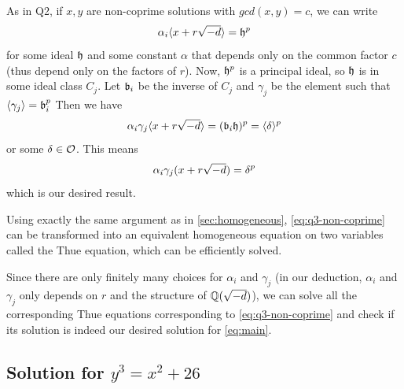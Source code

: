 As in Q2, if $x, y$ are non-coprime solutions with $gcd(x, y) = c$, we can write 
$$
	\alpha_i \langle x + r \sqrt{-d} \rangle = \mathfrak{h} ^p
$$
for some ideal $\mathfrak{h}$ and some constant $\alpha$ that depends only on the common factor $c$ (thus depend only on the factors of $r$).
Now, $\mathfrak{h}^p$ is a principal ideal, so $\mathfrak{h}$ is in some ideal class $C_j$.
Let $\mathfrak{b}_i$ be the inverse of $C_j$ and $\gamma_j$ be the element such that $\langle \gamma_j \rangle = \mathfrak{b}_i^p$
Then we have
$$
\alpha_i \gamma_j \langle x + r\sqrt{-d} \rangle= (\mathfrak{b}_i \mathfrak{h})^p = \langle \delta \rangle^p
$$
or some $\delta \in \mathcal{O}$.
This means 
\begin{equation}\label{eq:q3-non-coprime}
	\alpha_i \gamma_j (x + r\sqrt{-d}) = \delta^p
\end{equation}
which is our desired result.

Using exactly the same argument as in \autoref{sec:homogeneous},
\autoref{eq:q3-non-coprime} can be transformed into an equivalent homogeneous equation on two variables called the Thue equation, which can be efficiently solved. 

Since there are only finitely many choices for $\alpha_i$ and $\gamma_j$ (in our deduction, $\alpha_i$ and $\gamma_j$ only depends on $r$ and the structure of $\mathbb{Q}(\sqrt{-d})$),
we can solve all the corresponding Thue equations corresponding to \autoref{eq:q3-non-coprime} and check if its solution is indeed our desired solution for \autoref{eq:main}.

\subsection{Solution for \texorpdfstring{$y^3 = x^2 + 26$}{}}

